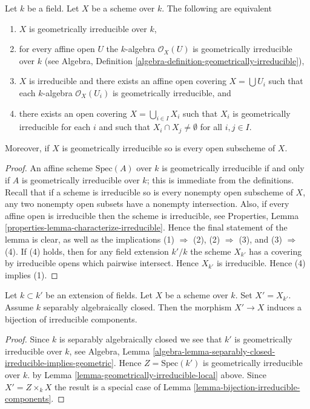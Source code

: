 \begin{lemma}
\label{lemma-geometrically-irreducible-local}
Let $k$ be a field. Let $X$ be a scheme over $k$.
The following are equivalent
\begin{enumerate}
\item $X$ is geometrically irreducible over $k$,
\item for every affine open $U$ the $k$-algebra $\mathcal{O}_X(U)$
is geometrically irreducible over $k$ (see
Algebra, Definition \ref{algebra-definition-geometrically-irreducible}),
\item $X$ is irreducible and there exists an affine open covering
$X = \bigcup U_i$ such that each $k$-algebra $\mathcal{O}_X(U_i)$ is
geometrically irreducible, and
\item there exists an open covering $X = \bigcup_{i \in I} X_i$ such
that $X_i$ is geometrically irreducible for each $i$ and such that
$X_i \cap X_j \not = \emptyset$ for all $i, j \in I$.
\end{enumerate}
Moreover, if $X$ is geometrically irreducible so is every
open subscheme of $X$.
\end{lemma}

\begin{proof}
An affine scheme $\text{Spec}(A)$ over $k$ is geometrically
irreducible if and only if $A$ is geometrically irreducible over $k$;
this is immediate from the definitions.
Recall that if a scheme is irreducible so is every nonempty
open subscheme of $X$, any two nonempty open subsets have
a nonempty intersection. Also, if every affine open is irreducible
then the scheme is irreducible, see Properties,
Lemma \ref{properties-lemma-characterize-irreducible}.
Hence the final statement of the lemma
is clear, as well as the implications (1) $\Rightarrow$ (2),
(2) $\Rightarrow$ (3), and (3) $\Rightarrow$ (4). If (4) holds,
then for any field extension $k'/k$ the scheme $X_{k'}$
has a covering by irreducible opens which pairwise intersect.
Hence $X_{k'}$ is irreducible. Hence (4) implies (1).
\end{proof}

\begin{lemma}
\label{lemma-separably-closed-field-irreducible-components}
Let $k \subset k'$ be an extension of fields.
Let $X$ be a scheme over $k$. Set $X' = X_{k'}$.
Assume $k$ separably algebraically closed.
Then the morphism $X' \to X$ induces a bijection of irreducible components.
\end{lemma}

\begin{proof}
Since $k$ is separably algebraically closed we see that
$k'$ is geometrically irreducible over $k$, see Algebra,
Lemma \ref{algebra-lemma-separably-closed-irreducible-implies-geometric}.
Hence $Z = \text{Spec}(k')$ is geometrically irreducible over $k$.
by Lemma \ref{lemma-geometrically-irreducible-local} above.
Since $X' = Z \times_k X$ the result is a special case
of Lemma \ref{lemma-bijection-irreducible-components}.
\end{proof}

